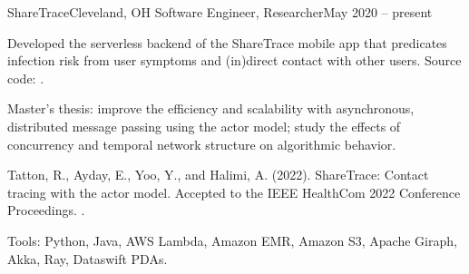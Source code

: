 \begin{ritemize}
{ShareTrace}{Cleveland, OH}
{Software Engineer, Researcher}{May 2020 -- present}
	\item Developed the serverless backend of the ShareTrace mobile app that predicates infection risk from user symptoms and (in)direct contact with other users. Source code: .
	\item Master's thesis: improve the efficiency and scalability with asynchronous, distributed message passing using the actor model; study the effects of concurrency and temporal network structure on algorithmic behavior.
	\item Tatton, R., Ayday, E., Yoo, Y., and Halimi, A. (2022). ShareTrace: Contact tracing with the actor model. Accepted to the IEEE HealthCom 2022 Conference Proceedings. .
	\item Tools: Python, Java, AWS Lambda, Amazon EMR, Amazon S3, Apache Giraph, Akka, Ray, Dataswift PDAs.
\end{ritemize}